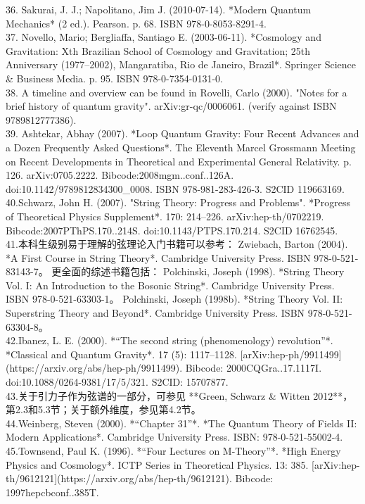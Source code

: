 36. Sakurai, J. J.; Napolitano, Jim J. (2010-07-14). *Modern Quantum Mechanics* (2 ed.). Pearson. p. 68. ISBN 978-0-8053-8291-4.\\
37. Novello, Mario; Bergliaffa, Santiago E. (2003-06-11). *Cosmology and Gravitation: Xth Brazilian School of Cosmology and Gravitation; 25th Anniversary (1977–2002), Mangaratiba, Rio de Janeiro, Brazil*. Springer Science & Business Media. p. 95. ISBN 978-0-7354-0131-0.\\
38. A timeline and overview can be found in Rovelli, Carlo (2000). "Notes for a brief history of quantum gravity". arXiv:gr-qc/0006061. (verify against ISBN 9789812777386).\\
39. Ashtekar, Abhay (2007). *Loop Quantum Gravity: Four Recent Advances and a Dozen Frequently Asked Questions*. The Eleventh Marcel Grossmann Meeting on Recent Developments in Theoretical and Experimental General Relativity. p. 126. arXiv:0705.2222. Bibcode:2008mgm..conf..126A. doi:10.1142/9789812834300_0008. ISBN 978-981-283-426-3. S2CID 119663169.\\
40.Schwarz, John H. (2007). "String Theory: Progress and Problems". *Progress of Theoretical Physics Supplement*. 170: 214–226. arXiv:hep-th/0702219. Bibcode:2007PThPS.170..214S. doi:10.1143/PTPS.170.214. S2CID 16762545.\\
41.本科生级别易于理解的弦理论入门书籍可以参考：  
Zwiebach, Barton (2004). *A First Course in String Theory*. Cambridge University Press. ISBN 978-0-521-83143-7。
更全面的综述书籍包括：  
Polchinski, Joseph (1998). *String Theory Vol. I: An Introduction to the Bosonic String*. Cambridge University Press. ISBN 978-0-521-63303-1。  
Polchinski, Joseph (1998b). *String Theory Vol. II: Superstring Theory and Beyond*. Cambridge University Press. ISBN 978-0-521-63304-8。\\
42.Ibanez, L. E. (2000). *“The second string (phenomenology) revolution”*. *Classical and Quantum Gravity*. 17 (5): 1117–1128. [arXiv:hep-ph/9911499](https://arxiv.org/abs/hep-ph/9911499). Bibcode: 2000CQGra..17.1117I. doi:10.1088/0264-9381/17/5/321. S2CID: 15707877.\\
43.关于引力子作为弦谱的一部分，可参见 **Green, Schwarz & Witten 2012**，第2.3和5.3节；关于额外维度，参见第4.2节。\\
44.Weinberg, Steven (2000). *“Chapter 31”*. *The Quantum Theory of Fields II: Modern Applications*. Cambridge University Press. ISBN: 978-0-521-55002-4.\\
45.Townsend, Paul K. (1996). *“Four Lectures on M-Theory”*. *High Energy Physics and Cosmology*. ICTP Series in Theoretical Physics. 13: 385. [arXiv:hep-th/9612121](https://arxiv.org/abs/hep-th/9612121). Bibcode: 1997hepcbconf..385T.\\

